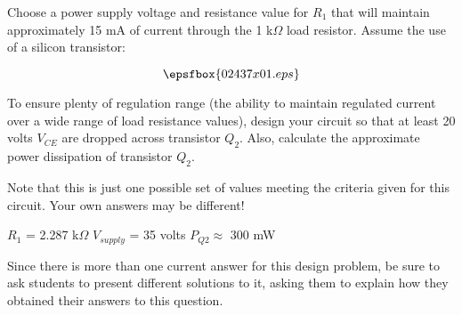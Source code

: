 

Choose a power supply voltage and resistance value for $R_1$ that will maintain approximately 15 mA of current through the 1 k$\Omega$ load resistor.  Assume the use of a silicon transistor:

$$\epsfbox{02437x01.eps}$$

To ensure plenty of regulation range (the ability to maintain regulated current over a wide range of load resistance values), design your circuit so that at least 20 volts $V_{CE}$ are dropped across transistor $Q_2$.  Also, calculate the approximate power dissipation of transistor $Q_2$.







Note that this is just one possible set of values meeting the criteria given for this circuit.  Your own answers may be different!

\vskip 5pt

$R_1$ = 2.287 k$\Omega$ \hskip 30pt $V_{supply}$ = 35 volts \hskip 30pt $P_{Q2} \approx $ 300 mW







Since there is more than one current answer for this design problem, be sure to ask students to present different solutions to it, asking them to explain how they obtained their answers to this question.





